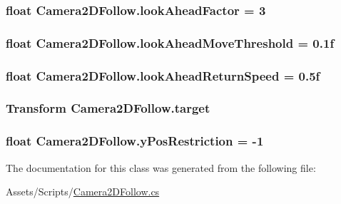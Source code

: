 \subsubsection[{look\+Ahead\+Factor}]{\setlength{\rightskip}{0pt plus 5cm}float Camera2\+D\+Follow.\+look\+Ahead\+Factor = 3}\label{class_camera2_d_follow_a86431f1e6fe757eba8a24e090af2c043}
\hypertarget{class_camera2_d_follow_ac0fe0344d2e533a6d7d9cfb302edd441}{}
\subsubsection[{look\+Ahead\+Move\+Threshold}]{\setlength{\rightskip}{0pt plus 5cm}float Camera2\+D\+Follow.\+look\+Ahead\+Move\+Threshold = 0.\+1f}\label{class_camera2_d_follow_ac0fe0344d2e533a6d7d9cfb302edd441}
\hypertarget{class_camera2_d_follow_a0144ad6ef4c5c33cc7b26484b92173ee}{}
\subsubsection[{look\+Ahead\+Return\+Speed}]{\setlength{\rightskip}{0pt plus 5cm}float Camera2\+D\+Follow.\+look\+Ahead\+Return\+Speed = 0.\+5f}\label{class_camera2_d_follow_a0144ad6ef4c5c33cc7b26484b92173ee}
\hypertarget{class_camera2_d_follow_a089f2d40d10a271bc723e0f73fcc183a}{}
\subsubsection[{target}]{\setlength{\rightskip}{0pt plus 5cm}Transform Camera2\+D\+Follow.\+target}\label{class_camera2_d_follow_a089f2d40d10a271bc723e0f73fcc183a}
\hypertarget{class_camera2_d_follow_ab77b151514b4cc19eb5c424c60785bd1}{}
\subsubsection[{y\+Pos\+Restriction}]{\setlength{\rightskip}{0pt plus 5cm}float Camera2\+D\+Follow.\+y\+Pos\+Restriction = -\/1}\label{class_camera2_d_follow_ab77b151514b4cc19eb5c424c60785bd1}


The documentation for this class was generated from the following file\+:\begin{DoxyCompactItemize}
\item 
Assets/\+Scripts/\hyperlink{_camera2_d_follow_8cs}{Camera2\+D\+Follow.\+cs}\end{DoxyCompactItemize}
